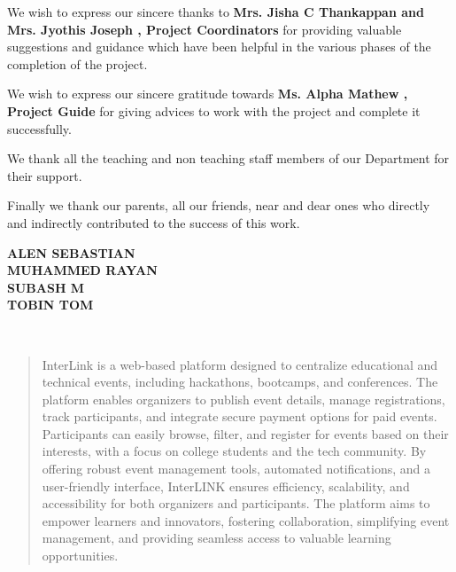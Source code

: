 \documentclass[twoside,a4paper,openright]{report} %
\begin{document}
We wish to express our sincere thanks to  \textbf{Mrs. Jisha C Thankappan and Mrs. Jyothis Joseph , Project Coordinators } for providing valuable suggestions and guidance which have been helpful in the various phases of the completion of the project.

We wish to express our sincere gratitude towards \textbf{Ms. Alpha Mathew , Project Guide } for giving advices to work with the project and complete it successfully.

We thank all the teaching and non teaching staff members of our Department for their support.


Finally we thank our parents, all our friends, near and dear ones who directly and indirectly contributed to the success of this work.

\begin{flushright}                                      

\textbf{ALEN SEBASTIAN \\
	MUHAMMED RAYAN \\
	SUBASH M\\
	TOBIN TOM
} 
\end{flushright} 
	
	
	
	
	
	
	


\thispagestyle{empty}

\mbox{~}
\begin{abstract}
	InterLink is a web-based platform designed to centralize educational and technical events, including hackathons, bootcamps, and conferences. The platform enables organizers to publish event details, manage registrations, track participants, and integrate secure payment options for paid events. Participants can easily browse, filter, and register for events based on their interests, with a focus on college students and the tech community. By offering robust event management tools, automated notifications, and a user-friendly interface, InterLINK ensures efficiency, scalability, and accessibility for both organizers and participants. The platform aims to empower learners and innovators, fostering collaboration, simplifying event management, and providing seamless access to valuable learning opportunities.
\end{abstract}	
\end{document}
